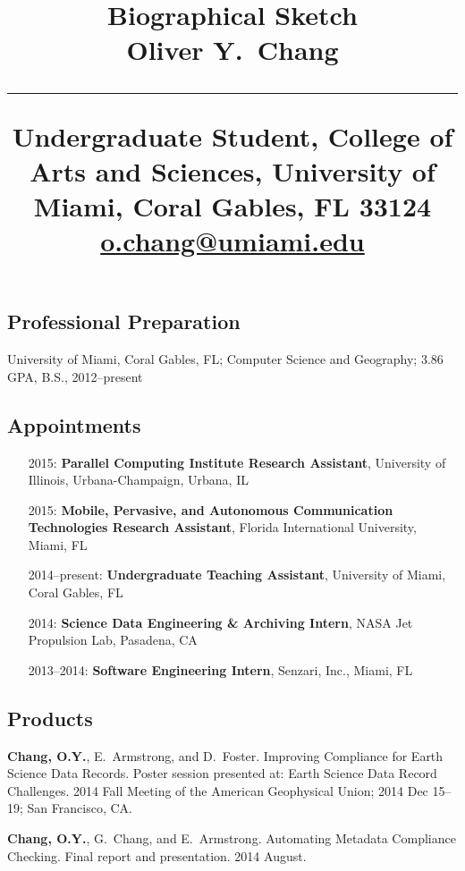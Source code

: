 \documentclass[svgnames,11pt]{article}
\title{%
        \vspace{-2\baselineskip}
            \normalsize
            Biographical Sketch\\
            \vspace{0.2\baselineskip}
            {\large\textbf{Oliver Y.~Chang}}\\
            \vspace{0.5\baselineskip}
            \hrule
            \vspace{0.5\baselineskip}
            Undergraduate Student, College of Arts and Sciences,
            University of Miami, Coral Gables, FL 33124\\
            \href{mailto:o.chang@umiami.edu}{o.chang@umiami.edu}
        \vspace{-1.5ex}
        }
\date{}
\author{}
\begin{document}
\maketitle
\vspace{-4\baselineskip}

\subsection{Professional Preparation}

    University of Miami, Coral Gables, FL;
        Computer Science and Geography;
        3.86 GPA, B.S., 2012--present

\subsection{Appointments}

\begin{itemize}[label={--9999:},leftmargin=*,itemsep=0pt]

    \item[2015:]
        \textbf{Parallel Computing Institute Research Assistant},
        University of Illinois, Urbana-Champaign,
        Urbana, IL

    \item[2015:]
        \textbf{Mobile, Pervasive, and Autonomous Communication Technologies Research Assistant},
        Florida International University,
        Miami, FL

    \item[2014--present:]
        \textbf{Undergraduate Teaching Assistant},
        University of Miami,
        Coral Gables, FL

    \item[2014:]
        \textbf{Science Data Engineering \& Archiving Intern},
        NASA Jet Propulsion Lab,
        Pasadena, CA

    \item[2013--2014:]
        \textbf{Software Engineering Intern},
        Senzari, Inc.,
        Miami, FL

\end{itemize}

\subsection{Products}

\begin{bibenum}[itemsep=5pt]

    \item \textbf{Chang, O.Y.}, E.~Armstrong, and D.~Foster.
        Improving Compliance for Earth Science Data Records.
        Poster session presented at: Earth Science Data Record Challenges.
        2014 Fall Meeting of the American Geophysical Union; 2014 Dec 15--19; San Francisco, CA.

    \item \textbf{Chang, O.Y.}, G.~Chang, and E.~Armstrong.
        Automating Metadata Compliance Checking.
        Final report and presentation. 2014 August.

\end{bibenum}
\end{document}
